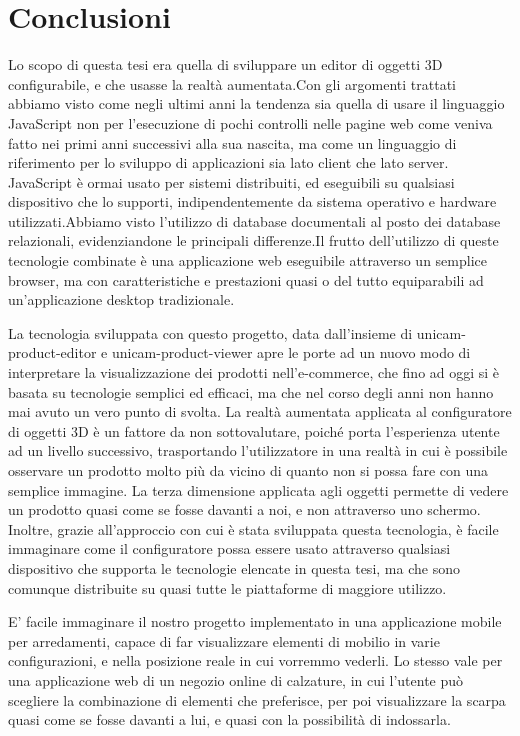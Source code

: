 \chapter{Conclusioni}
\label{chap:conclusioni}
Lo scopo di questa tesi era quella di sviluppare un editor di oggetti 3D configurabile, 
e che usasse la realtà aumentata.Con gli argomenti trattati abbiamo visto come negli 
ultimi anni la tendenza sia quella di usare il linguaggio JavaScript non per l'esecuzione 
di pochi controlli nelle pagine web come veniva fatto nei primi anni successivi alla 
sua nascita, ma come un linguaggio di riferimento per lo sviluppo di applicazioni 
sia lato client che lato server. JavaScript è ormai usato per sistemi distribuiti, 
ed eseguibili su qualsiasi dispositivo che lo supporti, indipendentemente da sistema 
operativo e hardware utilizzati.Abbiamo visto l'utilizzo di database documentali al 
posto dei database relazionali, evidenziandone le principali differenze.Il frutto 
dell'utilizzo di queste tecnologie combinate è una applicazione web eseguibile 
attraverso un semplice browser, ma con caratteristiche e prestazioni quasi o del 
tutto equiparabili ad un'applicazione desktop tradizionale.

La tecnologia sviluppata con questo progetto, data dall'insieme di unicam-product-editor
 e unicam-product-viewer apre le porte ad un nuovo modo di interpretare la visualizzazione
  dei prodotti nell'e-commerce, che fino ad oggi si è basata su tecnologie semplici 
  ed efficaci, ma che nel corso degli anni non hanno mai avuto un vero punto di svolta. 
  La realtà aumentata applicata al configuratore di oggetti 3D è un fattore da non 
  sottovalutare, poiché porta l'esperienza utente ad un livello successivo, trasportando 
  l'utilizzatore in una realtà in cui è possibile osservare un prodotto molto più da 
  vicino di quanto non si possa fare con una semplice immagine. La terza dimensione 
  applicata agli oggetti permette di vedere un prodotto quasi come se fosse davanti 
  a noi, e non attraverso uno schermo. Inoltre, grazie all'approccio con cui è stata 
  sviluppata questa tecnologia, è facile immaginare come il configuratore possa 
  essere usato attraverso qualsiasi dispositivo che supporta le tecnologie elencate 
  in questa tesi, ma che sono comunque distribuite su quasi tutte le piattaforme di 
  maggiore utilizzo.

E' facile immaginare il nostro progetto implementato in una applicazione mobile per arredamenti, 
capace di far visualizzare elementi di mobilio in varie configurazioni, e nella posizione reale 
in cui vorremmo vederli.
Lo stesso vale per una applicazione web di un negozio online di calzature, 
in cui l'utente può scegliere la combinazione di elementi che preferisce, per poi visualizzare 
la scarpa quasi come se fosse davanti a lui, e quasi con la possibilità di indossarla.

